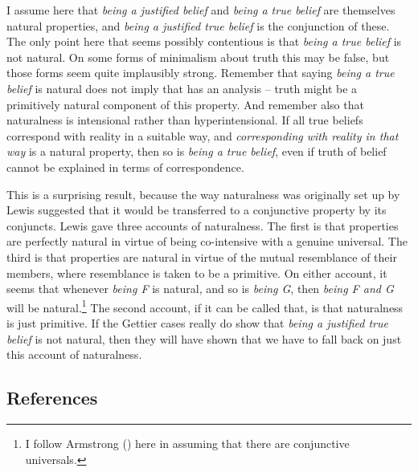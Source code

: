\documentclass[
  10pt,
  letterpaper,
  DIV=11,
  numbers=noendperiod,
  twoside]{scrartcl}
\begin{document}
I assume here that \emph{being a justified belief} and \emph{being a
true belief} are themselves natural properties, and \emph{being a
justified true belief} is the conjunction of these. The only point here
that seems possibly contentious is that \emph{being a true belief} is
not natural. On some forms of minimalism about truth this may be false,
but those forms seem quite implausibly strong. Remember that saying
\emph{being a true belief} is natural does not imply that has an
analysis -- truth might be a primitively natural component of this
property. And remember also that naturalness is intensional rather than
hyperintensional. If all true beliefs correspond with reality in a
suitable way, and \emph{corresponding with reality in that way} is a
natural property, then so is \emph{being a true belief}, even if truth
of belief cannot be explained in terms of correspondence.

This is a surprising result, because the way naturalness was originally
set up by Lewis suggested that it would be transferred to a conjunctive
property by its conjuncts. Lewis gave three accounts of naturalness. The
first is that properties are perfectly natural in virtue of being
co-intensive with a genuine universal. The third is that properties are
natural in virtue of the mutual resemblance of their members, where
resemblance is taken to be a primitive. On either account, it seems that
whenever \emph{being F} is natural, and so is \emph{being G}, then
\emph{being F and G} will be natural.\footnote{I follow Armstrong
  () here in assuming that
  there are conjunctive universals.} The second account, if it can be
called that, is that naturalness is just primitive. If the Gettier cases
really do show that \emph{being a justified true belief} is not natural,
then they will have shown that we have to fall back on just this account
of naturalness.

\subsection*{References}\label{references}
\end{document}
